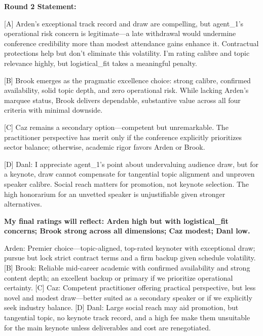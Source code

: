 \documentclass{article}
\begin{document}
\begin{tcolorbox}[mbox-neutral={agent\_2 -- discussion r2}]
\textbf{Round 2 Statement:}

[A] Arden's exceptional track record and draw are compelling, but agent\_1's operational risk concern is legitimate---a late withdrawal would undermine conference credibility more than modest attendance gains enhance it. Contractual protections help but don't eliminate this volatility. I'm rating calibre and topic relevance highly, but logistical\_fit takes a meaningful penalty.

[B] Brook emerges as the pragmatic excellence choice: strong calibre, confirmed availability, solid topic depth, and zero operational risk. While lacking Arden's marquee status, Brook delivers dependable, substantive value across all four criteria with minimal downside.

[C] Caz remains a secondary option---competent but unremarkable. The practitioner perspective has merit only if the conference explicitly prioritizes sector balance; otherwise, academic rigor favors Arden or Brook.

[D] Danl: I appreciate agent\_1's point about undervaluing audience draw, but for a keynote, draw cannot compensate for tangential topic alignment and unproven speaker calibre. Social reach matters for promotion, not keynote selection. The high honorarium for an unvetted speaker is unjustifiable given stronger alternatives.

\textbf{My final ratings will reflect: Arden high but with logistical\_fit concerns; Brook strong across all dimensions; Caz modest; Danl low.}
\end{tcolorbox}

\begin{tcolorbox}[mbox-neutral={agent\_3 -- discussion r2}]
[A] Arden: Premier choice---topic-aligned, top-rated keynoter with exceptional draw; pursue but lock strict contract terms and a firm backup given schedule volatility.  
[B] Brook: Reliable mid-career academic with confirmed availability and strong content depth; an excellent backup or primary if we prioritize operational certainty.  
[C] Caz: Competent practitioner offering practical perspective, but less novel and modest draw---better suited as a secondary speaker or if we explicitly seek industry balance.  
[D] Danl: Large social reach may aid promotion, but tangential topic, no keynote track record, and a high fee make them unsuitable for the main keynote unless deliverables and cost are renegotiated.
\end{tcolorbox}
\end{document}
